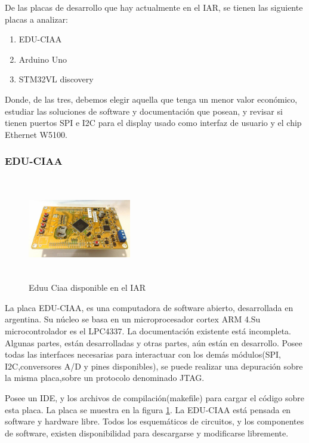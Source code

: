  De las placas de desarrollo que hay actualmente en el IAR, se tienen las siguiente placas a analizar: 
 
\begin{enumerate}
	\item EDU-CIAA
	\item Arduino Uno 
	\item STM32VL discovery 
\end{enumerate}
Donde, de las tres, debemos elegir aquella que tenga un menor valor económico, estudiar las soluciones de software y documentación que posean, y revisar si tienen puertos SPI e I2C para el display usado como interfaz de usuario y el chip Ethernet W5100.  

\subsubsection{EDU-CIAA}

\begin{figure}
	\includegraphics[width=0.4\textwidth , height=  45mm]{edu_ciaa}
	\caption{Eduu Ciaa disponible en el IAR}
	\label{fig:edu_ciaa}
\end{figure}
La placa EDU-CIAA, es una computadora de software abierto, desarrollada en argentina. Su núcleo se basa en un microprocesador cortex ARM 4.Su microcontrolador es el LPC4337. La documentación existente está incompleta. Algunas partes, están desarrolladas y otras partes, aún están en desarrollo. Posee todas las interfaces necesarias para interactuar con los demás módulos(SPI, I2C,conversores A/D y pines disponibles), se puede realizar una depuración sobre la misma placa,sobre un protocolo denominado JTAG. 


Posee un IDE, y los archivos de compilación(makefile) para cargar el código sobre esta placa. La placa se muestra en la figura \ref{fig:edu_ciaa}. La EDU-CIAA está pensada en software y hardware libre. Todos los esquemáticos de circuitos, y los componentes de software, existen disponibilidad para descargarse y modificarse libremente. 

